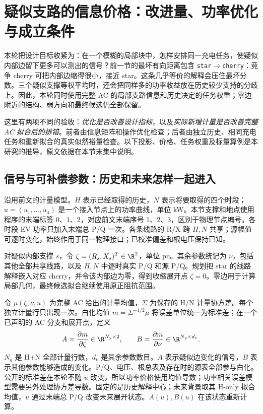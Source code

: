 \section{疑似支路的信息价格：改进量、功率优化与成立条件}
\label{si:section}

本轮把设计目标收紧为：在一个模糊的局部块中，怎样安排同一充电任务，使疑似内部边留下更多可以测出的信号？前一节的最坏有向距离包含 \texttt{star}$\to$\texttt{cherry}：竞争 cherry 可把内部边缩得很小，接近 star。这条几乎等价的解释会压住最坏分数。三个疑似支撑等权平均时，还会把同样多的功率收益放在历史较少支持的分歧上。因此，本轮同时使用完整 AC 的局部支路信息和历史决定的任务权重；零边附近的结构、弱方向和最终候选仍全部保留。

这里有两项不同的验收：\emph{优化是否改善设计指标}，以及\emph{实际新增计量是否改善完整 AC 拟合后的排错}。前者由信息矩阵和操作优化检查；后者由独立历史、相同充电任务和重新拟合的真实似然裕量检查。以下投影、价格、任务权重及标量算例是本研究的推导，原文依据在本节末集中说明。

\subsection{信号与可补偿参数：历史和未来怎样一起进入}

沿用前文的计量模型。$H$ 表示已经取得的历史，$N$ 表示将要取得的四个时段；$u=(u_1,\ldots,u_4)$ 是一个接入节点上的功率曲线，单位 kW。本节支撑和地点使用程序的末端标签 0、1、2，对应前文末端序号 1、2、3，区别于物理节点编号。各时段 EV 功率只加入末端总 P/Q 一次。各条线路的 R/X 跨 $H,N$ 共享；源幅值可逐时变化，始终作用于同一物理接口；已校准偏差和根电压保持已知。

对疑似内部支撑 $s$，令 $\zeta=(R_s,X_s)^T\in\R^2$，单位 pu。其余参数统记为 $\nu$，包括其他全部共享线路，以及 $H,N$ 中逐时真实 P/Q 和源 P/Q。规划把 star 的线路解释嵌入对应 cherry，并令该内部边为零，得到收缩展开点 $\zeta=0$。零边用于计算局部几何，最终候选拟合继续使用原正阻抗范围。

令 $\mu(\zeta,\nu,u)$ 为完整 AC 给出的计量均值，$\Sigma$ 为保存的 H/N 计量协方差。每个独立计量行只出现一次。白化均值 $m=\Sigma^{-1/2}\mu$ 将误差单位统一为标准差；在一个已声明的 AC 分支和展开点，定义
\begin{equation}
 A=\frac{\partial m}{\partial\zeta}\in\R^{N_y\times2},\qquad
 B=\frac{\partial m}{\partial\nu}\in\R^{N_y\times d_\nu}.
 \label{si:AB}
\end{equation}
$N_y$ 是 H+N 全部计量行数，$d_\nu$ 是其余参数数目。$A$ 表示疑似边变化的信号，$B$ 表示其他参数能够造成的变化。P/Q、电压、根总表及存在时的源表全部参与白化。公开的标准差在本轮不随 $u$ 改变，所以功率价格使用均值导数；功率相关误差模型需要另外处理协方差导数。固定的是历史解释中心；未来背景取其 H-only 拟合均值，$u$ 通过末端总 P/Q 改变未来展开状态。$A(u),B(u)$ 在该状态重新计算。

